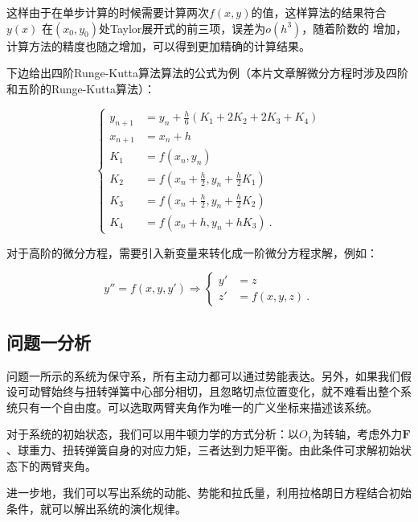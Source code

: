\documentclass[a4paper,c5size,twoside,UTF8]{ctexart} %
\newcommand{\FS}[2]{\displaystyle\frac{#1}{#2}}
\numberwithin{equation}{section}   %
\begin{document}
这样由于在单步计算的时候需要计算两次$f\left(x,y\right)$的值，这样算法的结果符合$y\left(x\right)$
在$\left(x_0,y_0\right)$处Taylor展开式的前三项，误差为$o\left(h^3\right)$，随着阶数的
增加，计算方法的精度也随之增加，可以得到更加精确的计算结果。

下边给出四阶Runge-Kutta算法算法的公式为例（本片文章解微分方程时涉及四阶和五阶的Runge-Kutta算法）：

\begin{equation}
	\left\{
		\begin{aligned}
			y_{n+1}&= y_n+\FS{h}{6}\left( K_1+2K_2+2K_3+K_4 \right) \\
			x_{n+1}&=x_n+h \\
			K_1&=f\left( x_n,y_n \right) \\
			K_2&=f\left( x_{n}+\FS{h}{2},y_n+\FS{h}{2}K_1 \right) \\
			K_3&=f\left( x_{n}+\FS{h}{2},y_n+\FS{h}{2}K_2 \right) \\
			K_4&=f\left( x_{n}+{h},y_n+{h}K_3 \right) ~.
		\end{aligned}
	\right.
\end{equation}

对于高阶的微分方程，需要引入新变量来转化成一阶微分方程求解，例如：

\begin{equation}
	y''=f\left(x,y,y'\right)\Longrightarrow 
	\left\{
		\begin{aligned}
			y'&=z \\
			z'&=f\left(x,y,z\right) ~.
		\end{aligned}
	\right.
\end{equation}

\newpage

\subsection{问题一分析}

问题一所示的系统为保守系，所有主动力都可以通过势能表达。另外，如果我们假设可动臂始终与扭转弹簧中心部分相切，且忽略切点位置变化，就不难看出整个系统只有一个自由度。可以选取两臂夹角作为唯一的广义坐标来描述该系统。

对于系统的初始状态，我们可以用牛顿力学的方式分析：以$O_1$为转轴，考虑外力$\boldsymbol{F}$、球重力、扭转弹簧自身的对应力矩，三者达到力矩平衡。由此条件可求解初始状态下的两臂夹角。

进一步地，我们可以写出系统的动能、势能和拉氏量，利用拉格朗日方程结合初始条件，就可以解出系统的演化规律。
\end{document}
